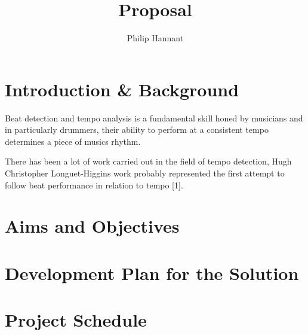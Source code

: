\documentclass{article} \title{Proposal} \author{Philip Hannant}
\begin{document}
 \maketitle{} \section{Introduction \& Background}
Beat detection and tempo analysis is a fundamental skill honed by musicians and in particularly drummers, their ability to perform at a consistent tempo determines a piece of musics rhythm. 

There has been a lot of work carried out in the field of tempo detection, Hugh Christopher Longuet-Higgins work probably represented the first attempt to follow beat performance in relation to tempo [1]. 


\maketitle{} \section{Aims and Objectives}



\maketitle{} 
\section{Development Plan for the Solution}

\maketitle{} 
\section{Project Schedule}
\end{document}
